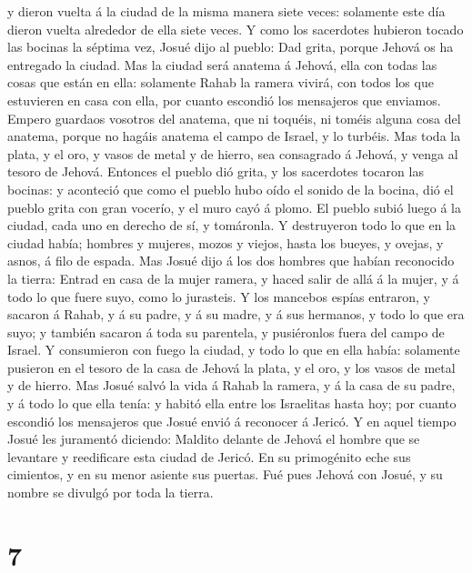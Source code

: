 y dieron vuelta á la ciudad de la misma manera siete veces: solamente
este día dieron vuelta alrededor de ella siete veces.  Y
como los sacerdotes hubieron tocado las bocinas la séptima vez, Josué
dijo al pueblo: Dad grita, porque Jehová os ha entregado la ciudad.
 Mas la ciudad será anatema á Jehová, ella con todas las
cosas que están en ella: solamente Rahab la ramera vivirá, con todos los
que estuvieren en casa con ella, por cuanto escondió los mensajeros que
enviamos.  Empero guardaos vosotros del anatema, que ni
toquéis, ni toméis alguna cosa del anatema, porque no hagáis anatema el
campo de Israel, y lo turbéis.  Mas toda la plata, y el
oro, y vasos de metal y de hierro, sea consagrado á Jehová, y venga al
tesoro de Jehová.  Entonces el pueblo dió grita, y los
sacerdotes tocaron las bocinas: y aconteció que como el pueblo hubo oído
el sonido de la bocina, dió el pueblo grita con gran vocerío, y el muro
cayó á plomo. El pueblo subió luego á la ciudad, cada uno en derecho de
sí, y tomáronla.  Y destruyeron todo lo que en la ciudad
había; hombres y mujeres, mozos y viejos, hasta los bueyes, y ovejas, y
asnos, á filo de espada.  Mas Josué dijo á los dos hombres
que habían reconocido la tierra: Entrad en casa de la mujer ramera, y
haced salir de allá á la mujer, y á todo lo que fuere suyo, como lo
jurasteis.  Y los mancebos espías entraron, y sacaron á
Rahab, y á su padre, y á su madre, y á sus hermanos, y todo lo que era
suyo; y también sacaron á toda su parentela, y pusiéronlos fuera del
campo de Israel.  Y consumieron con fuego la ciudad, y todo
lo que en ella había: solamente pusieron en el tesoro de la casa de
Jehová la plata, y el oro, y los vasos de metal y de hierro.
 Mas Josué salvó la vida á Rahab la ramera, y á la casa de
su padre, y á todo lo que ella tenía: y habitó ella entre los Israelitas
hasta hoy; por cuanto escondió los mensajeros que Josué envió á
reconocer á Jericó.  Y en aquel tiempo Josué les juramentó
diciendo: Maldito delante de Jehová el hombre que se levantare y
reedificare esta ciudad de Jericó. En su primogénito eche sus cimientos,
y en su menor asiente sus puertas.  Fué pues Jehová con
Josué, y su nombre se divulgó por toda la tierra.

\hypertarget{section-6}{%
\section{7}\label{section-6}}

